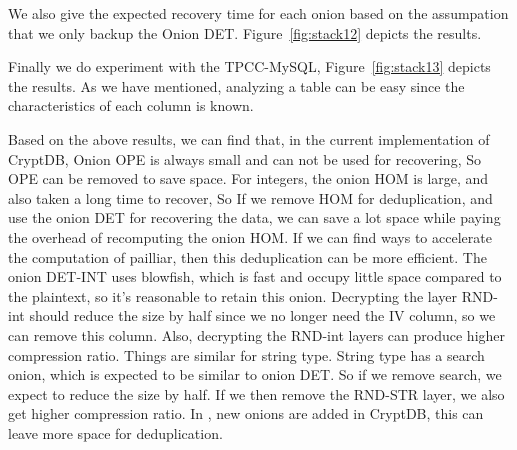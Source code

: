 

We also give the expected recovery time for each onion based on the assumpation that we only backup the Onion DET. Figure~\ref{fig:stack12} depicts the results.


Finally we do experiment with the TPCC-MySQL, Figure~\ref{fig:stack13} depicts the results. As we have mentioned, analyzing a table can be easy since the characteristics of each column is known. 






Based on the above results, we can find that, in the current implementation of CryptDB, Onion OPE is always small and can not be used for recovering, So OPE can be removed  to save space. For integers, the onion HOM is large, and also taken a long time to recover, So If we remove HOM for deduplication, and use the onion DET for recovering the data, we can save a lot space while paying the overhead of recomputing the onion HOM. If we can find ways to accelerate the computation of pailliar, then this deduplication can be more efficient. The onion DET-INT uses blowfish, which is fast and occupy little space compared to the plaintext, so it's reasonable to retain this onion. Decrypting the layer RND-int should reduce the size by half since we no longer need the IV column, so we can remove this column. Also, decrypting the RND-int layers can produce higher compression ratio. Things are similar for string type. String type has a search onion, which is expected to be similar to onion DET. So if we remove search, we expect to reduce the size by half. If we then remove the RND-STR layer, we also get higher compression ratio. In \citep{popa2015guidelines}, new onions are added in CryptDB, this can leave more space for deduplication.



